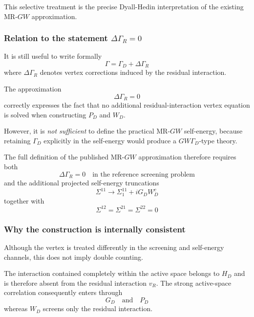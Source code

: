 \documentclass[aip,jcp,reprint,noshowkeys,superscriptaddress]{revtex4-1}
\begin{document}
This selective treatment is the precise Dyall-Hedin interpretation of
the existing MR-$GW$ approximation.


\subsubsection{Relation to the statement
\texorpdfstring{$\Delta\Gamma_R=0$}{Delta Gamma R = 0}}

It is still useful to write formally
\begin{equation}
  \Gamma
  =
  \Gamma_D
  +
  \Delta\Gamma_R
\end{equation}
where $\Delta\Gamma_R$ denotes vertex corrections induced by the
residual interaction.

The approximation
\begin{equation}
  \Delta\Gamma_R=0
\end{equation}
correctly expresses the fact that no additional residual-interaction
vertex equation is solved when constructing $P_D$ and $W_D$.

However, it is \emph{not sufficient} to define the practical MR-$GW$
self-energy, because retaining $\Gamma_D$ explicitly in the
self-energy would produce a $GW\Gamma_D$-type theory.

The full definition of the published MR-$GW$ approximation therefore
requires both
\begin{equation}
  \Delta\Gamma_R=0
  \quad\text{in the reference screening problem}
\end{equation}
and the additional projected self-energy truncations
\begin{equation}
  \Sigma^{11}
  \rightarrow
  \Sigma_1^{11}
  +
  iG_DW_D^c
\end{equation}
together with
\begin{equation}
  \Sigma^{12}
  =
  \Sigma^{21}
  =
  \Sigma^{22}
  =
  0
\end{equation}


\subsubsection{Why the construction is internally consistent}

Although the vertex is treated differently in the screening and
self-energy channels, this does not imply double counting.

The interaction contained completely within the active space belongs to
$H_D$ and is therefore absent from the residual interaction $v_R$.
The strong active-space correlation consequently enters through
\begin{equation}
  G_D
  \quad\text{and}\quad
  P_D
\end{equation}
whereas $W_D$ screens only the residual interaction.
\end{document}
